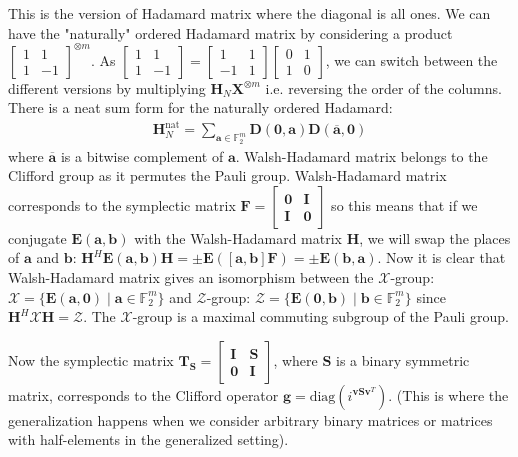 \documentclass{article}
\begin{document}
This is the version of Hadamard matrix where the diagonal is all ones. We can have the "naturally" ordered Hadamard matrix by considering a product $\begin{bmatrix} 1 & 1 \\ 1 & -1 \end{bmatrix}^{\otimes m}$. As $\begin{bmatrix} 1 & 1 \\ 1 & -1 \end{bmatrix} = \begin{bmatrix} 1 & 1 \\ -1 & 1 \end{bmatrix} \begin{bmatrix} 0 & 1 \\ 1 & 0 \end{bmatrix}$, we can switch between the different versions by multiplying $\mathbf{H}_N\mathbf{X}^{\otimes m}$ i.e. reversing the order of the columns.
There is a neat sum form for the naturally ordered Hadamard:
\begin{align*}
	\mathbf{H}^{\text{nat}}_N = \sum_{\mathbf{a} \in \mathbb{F}_2^m} \mathbf{D}(\mathbf{0}, \mathbf{a}) \mathbf{D}(\overline{\mathbf{a}}, \mathbf{0})
\end{align*}
where $\overline{\mathbf{a}}$ is a bitwise complement of $\mathbf{a}$. 
	Walsh-Hadamard matrix belongs to the Clifford group as it permutes the Pauli group. Walsh-Hadamard matrix corresponds to the symplectic matrix $\mathbf{F} = \begin{bmatrix}
		\mathbf{0} & \mathbf{I} \\
		\mathbf{I} & \mathbf{0}
	\end{bmatrix}$
	so this means that if we conjugate $\mathbf{E}(\mathbf{a},\mathbf{b})$ with the Walsh-Hadamard matrix $\mathbf{H}$, we will swap the places of $\mathbf{a}$ and $\mathbf{b}$: $\mathbf{H}^H\mathbf{E}(\mathbf{a},\mathbf{b})\mathbf{H} = \pm \mathbf{E}(\left[\mathbf{a},\mathbf{b}\right]\mathbf{F}) = \pm \mathbf{E}(\mathbf{b},\mathbf{a})$. Now it is clear that Walsh-Hadamard matrix gives an isomorphism between the $\mathcal{X}$-group: $\mathcal{X} = \{\mathbf{E}(\mathbf{a},\mathbf{0}) \mid \mathbf{a} \in \mathbb{F}^m_2 \}$ and $\mathcal{Z}$-group: $\mathcal{Z} = \{\mathbf{E}(\mathbf{0},\mathbf{b}) \mid \mathbf{b} \in \mathbb{F}^m_2 \}$ since $\mathbf{H}^H\mathcal{X}\mathbf{H} = \mathcal{Z}$. The $\mathcal{X}$-group is a maximal commuting subgroup of the Pauli group.
	
	Now the symplectic matrix $\mathbf{T}_\mathbf{S} = \begin{bmatrix} \mathbf{I} & \mathbf{S} \\ \mathbf{0} & \mathbf{I} \end{bmatrix}$, where $\mathbf{S}$ is a binary symmetric matrix, corresponds to the Clifford operator $\mathbf{g} = \text{diag}(i^{\mathbf{v}\mathbf{S}\mathbf{v}^T})$. (This is where the generalization happens when we consider arbitrary binary matrices or matrices with half-elements in the generalized setting).
	
\end{document}
